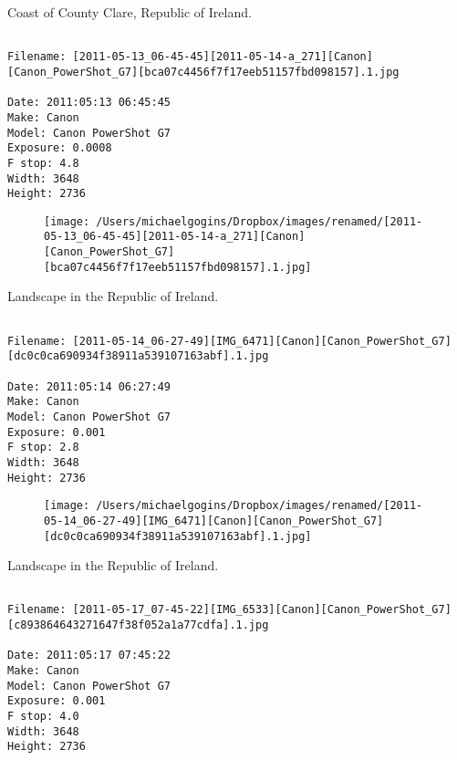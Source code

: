 \documentclass[11pt,letter,DIV=14,paper=landscape]{scrbook}
\begin{document}
\clearpage
\noindent Coast of County Clare, Republic of Ireland.
\noindent
\begin{lstlisting}

Filename: [2011-05-13_06-45-45][2011-05-14-a_271][Canon][Canon_PowerShot_G7][bca07c4456f7f17eeb51157fbd098157].1.jpg

Date: 2011:05:13 06:45:45
Make: Canon
Model: Canon PowerShot G7
Exposure: 0.0008
F stop: 4.8
Width: 3648
Height: 2736
\end{lstlisting}
\clearpage

\begin{figure}
\texttt{[image: /Users/michaelgogins/Dropbox/images/renamed/[2011-05-13\_06-45-45][2011-05-14-a\_271][Canon][Canon\_PowerShot\_G7][bca07c4456f7f17eeb51157fbd098157].1.jpg]}
\end{figure}
    
\clearpage
\noindent Landscape in the Republic of Ireland.
\noindent
\begin{lstlisting}

Filename: [2011-05-14_06-27-49][IMG_6471][Canon][Canon_PowerShot_G7][dc0c0ca690934f38911a539107163abf].1.jpg

Date: 2011:05:14 06:27:49
Make: Canon
Model: Canon PowerShot G7
Exposure: 0.001
F stop: 2.8
Width: 3648
Height: 2736
\end{lstlisting}
\clearpage

\begin{figure}
\texttt{[image: /Users/michaelgogins/Dropbox/images/renamed/[2011-05-14\_06-27-49][IMG\_6471][Canon][Canon\_PowerShot\_G7][dc0c0ca690934f38911a539107163abf].1.jpg]}
\end{figure}
    
\clearpage
\noindent Landscape in the Republic of Ireland.
\noindent
\begin{lstlisting}

Filename: [2011-05-17_07-45-22][IMG_6533][Canon][Canon_PowerShot_G7][c893864643271647f38f052a1a77cdfa].1.jpg

Date: 2011:05:17 07:45:22
Make: Canon
Model: Canon PowerShot G7
Exposure: 0.001
F stop: 4.0
Width: 3648
Height: 2736
\end{lstlisting}
\clearpage
\end{document}
